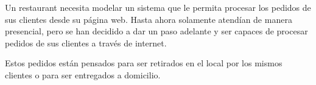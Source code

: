 \documentclass[11pt,letterpaper]{article}
\begin{document}
\begin{spacing}{1.2}
\thispagestyle{empty}
\evaluationTitle

\newcommand{\separatorLine}{\begin{center}\rule{.6\textwidth}{1pt}\end{center}}

\begin{Problem}

    Un restaurant necesita modelar un sistema que le permita procesar
    los pedidos de sus clientes desde su página web. Hasta ahora solamente atendían de manera presencial, pero se
    han decidido a dar un paso adelante y ser capaces de procesar pedidos de sus clientes a través
    de internet.
    
    Estos pedidos
    están pensados para ser retirados en el local por los mismos clientes o para ser entregados a domicilio.


\end{Problem}
\end{spacing}
\end{document}
